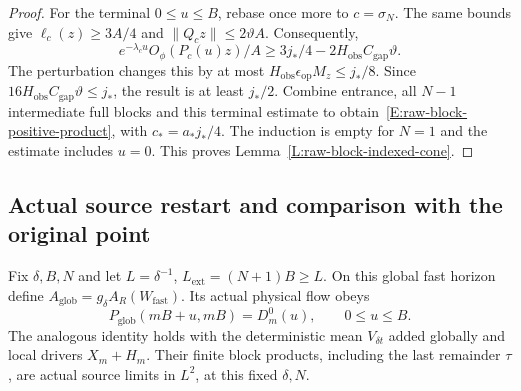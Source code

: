 \begin{proof}
  For the terminal $0\le u\le B$, rebase once more to $c=\sigma_N$.
  The same bounds give $\ell_c(z)\ge3A/4$ and
  $\|Q_cz\|\le2\vartheta A$. Consequently,
  \[
    e^{-\lambda_cu}O_\phi(P_c(u)z)/A
    \ge3j_*/4-2H_{\mathrm{obs}}C_{\mathrm{gap}}\vartheta.
  \]
  The perturbation changes this by at most
  $H_{\mathrm{obs}}\epsilon_{\mathrm{op}}M_z\le j_*/8$.
  Since $16H_{\mathrm{obs}}C_{\mathrm{gap}}\vartheta\le j_*$,
  the result is at least $j_*/2$.
  Combine entrance, all $N-1$ intermediate full blocks and this
  terminal estimate to obtain~\eqref{E:raw-block-positive-product},
  with $c_*=a_*j_*/4$. The induction is empty for $N=1$ and
  the estimate includes $u=0$.
  This proves Lemma~\ref{L:raw-block-indexed-cone}.
\end{proof}

\subsection{Actual source restart and comparison with the original point}

\begin{lemma}
  \label{L:raw-block-restart}
  Fix $\delta,B,N$ and let $L=\delta^{-1}$,
  $L_{\mathrm{ext}}=(N+1)B\ge L$. On this global fast horizon define
  $A_{\mathrm{glob}}=g_\delta A_R(W_{\mathrm{fast}})$.
  Its actual physical flow obeys
  \begin{equation}\label{E:raw-block-restart}
    P_{\mathrm{glob}}(mB+u,mB)=D_m^0(u),\qquad 0\le u\le B.
  \end{equation}
  The analogous identity holds with the deterministic mean
  $V_{\delta t}$ added globally and local drivers $X_m+H_m$.
  Their finite block products, including the last remainder $\tau$,
  are actual source limits in $L^2$, at this fixed $\delta,N$.
\end{lemma}


